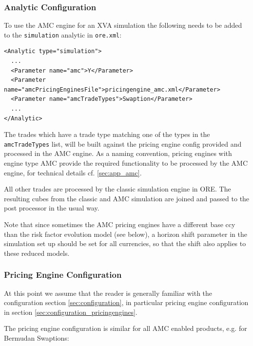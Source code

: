 \documentclass[12pt, a4paper]{article}
\begin{document}
\subsubsection*{Analytic Configuration}
\label{sec:amc_applicationconfig}

To use the AMC engine for an XVA simulation the following needs to be added to the {\tt simulation} analytic in {\tt ore.xml}:

\begin{verbatim}
<Analytic type="simulation">
  ...
  <Parameter name="amc">Y</Parameter>
  <Parameter name="amcPricingEnginesFile">pricingengine_amc.xml</Parameter>
  <Parameter name="amcTradeTypes">Swaption</Parameter>
  ...
</Analytic>
\end{verbatim}

The trades which have a trade type matching one of the types in the \verb+amcTradeTypes+ list, will be built against the
pricing engine config provided and processed in the AMC engine. As a naming convention, pricing engines with engine type
AMC provide the required functionality to be processed by the AMC engine, for technical details cf. \ref{sec:app_amc}.

All other trades are processed by the classic simulation engine in ORE. The resulting cubes from the classic and AMC
simulation are joined and passed to the post processor in the usual way.

Note that since sometimes the AMC pricing engines have a different base ccy than the risk factor evolution model (see
below), a horizon shift parameter in the simulation set up should be set for all currencies, so that the shift also
applies to these reduced models.

\subsubsection*{Pricing Engine Configuration}
\label{sec:amc_pricingengineconfig}

At this point we assume that the reader is generally familiar with the configuration section 
\ref{sec:configuration}, in particular pricing engine configuration in section \ref{sec:configuration_pricingengines}.

The pricing engine configuration is similar for all AMC enabled products, e.g. for Bermudan Swaptions:
\end{document}
